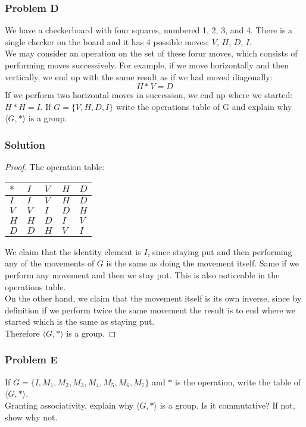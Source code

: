 \documentclass[11pt]{article}
\begin{document}
	\subsubsection*{Problem D}
	We have a checkerboard with four squares, numbered 1, 2, 3, and 4. There is a single checker on the board and it has 4 possible moves: $V$, $H$, $D$, $I$.\\
	We may consider an operation on the set of these forur moves, which consists of performing moves successively. For example, if we move horizontally and then vertically, we end up with the same result as if we had moved diagonally:
	\begin{equation*}
	H * V = D
	\end{equation*}
	If we perform two horizontal moves in succession, we end up where we started: $H*H=I$. If $G=\{V,H,D,I\}$ write the operations table of G and explain why $\langle G,* \rangle$ is a group.
	\subsubsection*{Solution}
	\begin{proof}
	The operation table:\\
		\begin{adjustbox}{max width=\textwidth,center}
		\begin{tabular}{l|llll}
			$*$ & $I$ & $V$ & $H$ & $D$ \\ \hline
			$I$ & $I$ & $V$ & $H$ & $D$ \\
			$V$ & $V$ & $I$ & $D$ & $H$ \\
			$H$ & $H$ & $D$ & $I$ & $V$ \\
			$D$ & $D$ & $H$ & $V$ & $I$ \\
		\end{tabular}
		\end{adjustbox}
	We claim that the identity element is $I$, since staying put and then performing any of the movements of $G$ is the same as doing the movement itself. Same if we perform any movement and then we stay put. This is also noticeable in the operations table.\\
	On the other hand, we claim that the movement itself is its own inverse, since by definition if we perform twice the same movement the result is to end where we started which is the same as staying put.\\
	Therefore $\langle G, * \rangle$ is a group.	
	\end{proof}
	\subsubsection*{Problem E}
	If $G=\{I,M_1,M_2,M_3,M_4,M_5,M_6,M_7\}$ and $*$ is the operation, write the table of $\langle G, *\rangle$.\\
	Granting associativity, explain why $\langle G, *\rangle$ is a group. Is it commutative? If not, show why not.
	\cleardoublepage 
\end{document}
